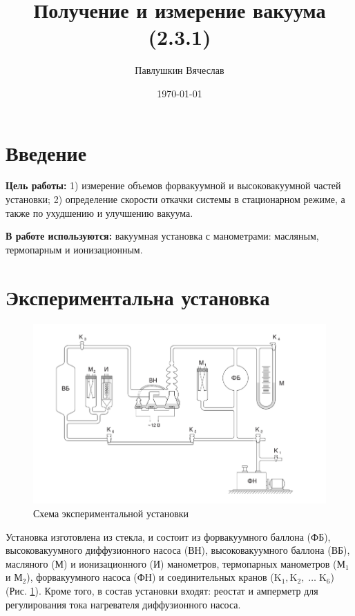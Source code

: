 \documentclass[a4paper,12pt]{article}
\title{Получение и измерение вакуума (2.3.1)}
\author{Павлушкин Вячеслав}
\date{\today}
\theoremstyle{definition}
\begin{document}
	\maketitle
	
	\section{Введение}
	\noindent\textbf{Цель работы:} 1) измерение объемов форвакуумной и высоковакуумной частей установки; 2) определение скорости откачки системы в стационарном режиме, а также по ухудшению и улучшению вакуума.\\
	\bigskip
	
	\noindent\textbf{В работе используются:} вакуумная установка с манометрами: масляным, термопарным и ионизационным.
	
	\section{Экспериментальна установка}
	
	\begin{figure}[h!]
		\centering
		\includegraphics[scale=0.53]{facility.jpg}
		\caption{Схема экспериментальной установки}
		\label{facility}
	\end{figure}

	Установка изготовлена из стекла,
	и состоит из форвакуумного баллона (ФБ), высоковакуумного диффузионного насоса (ВН), высоковакуумного баллона (ВБ), масляного (М) и ионизационного (И) манометров, термопарных манометров ($\text{М}_1$ и $\text{М}_2$), форвакуумного насоса (ФН) и соединительных кранов ($\text{K}_1, \text{K}_2,\; \ldots \;\text{K}_6$) (Рис. \ref{facility}). Кроме того, в состав установки входят: реостат и амперметр для регулирования тока нагревателя диффузионного насоса.
	
\end{document}
